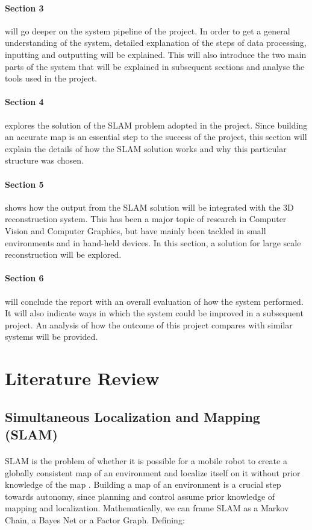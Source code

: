 \documentclass[11pt]{article}
\begin{document}
		\paragraph{Section 3} will go deeper on the system pipeline of the project. In order to get a general understanding of the system, detailed explanation of the steps of data processing, inputting and outputting will be explained. This will also introduce the two main parts of the system that will be explained in subsequent sections and analyse the tools used in the project.
		
		\paragraph{Section 4} explores the solution of the SLAM problem adopted in the project. Since building an accurate map is an essential step to the success of the project, this section will explain the details of how the SLAM solution works and why this particular structure was chosen.
		
		\paragraph{Section 5} shows how the output from the SLAM solution will be integrated with the 3D reconstruction system. This has been a major topic of research in Computer Vision and Computer Graphics, but have mainly been tackled in small environments and in hand-held devices. In this section, a solution for large scale reconstruction will be explored.
		
		\paragraph{Section 6} will conclude the report with an overall evaluation of how the system performed. It will also indicate ways in which the system could be improved in a subsequent project. An analysis of how the outcome of this project compares with similar systems will be provided.

	\newpage
	\section{Literature Review}
	\subsection{Simultaneous Localization and Mapping (SLAM)}
	\paragraph{}
	SLAM is the problem of whether it is possible for a mobile robot to create a globally consistent map of an environment and localize itself on it without prior knowledge of the map \cite{SLAMPartI}\cite{Cadena}. Building a map of an environment is a crucial step towards autonomy, since planning and control assume prior knowledge of mapping and localization. Mathematically, we can frame SLAM as a Markov Chain, a Bayes Net or a Factor Graph. Defining:
	
\end{document}
